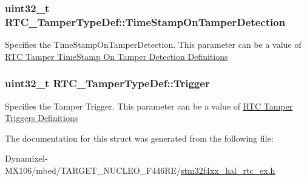 \subsubsection[{\texorpdfstring{Time\+Stamp\+On\+Tamper\+Detection}{TimeStampOnTamperDetection}}]{\setlength{\rightskip}{0pt plus 5cm}uint32\+\_\+t R\+T\+C\+\_\+\+Tamper\+Type\+Def\+::\+Time\+Stamp\+On\+Tamper\+Detection}\hypertarget{struct_r_t_c___tamper_type_def_ae2685d2368c30ca2eeb3bd05c5094b2a}{}\label{struct_r_t_c___tamper_type_def_ae2685d2368c30ca2eeb3bd05c5094b2a}
Specifies the Time\+Stamp\+On\+Tamper\+Detection. This parameter can be a value of \hyperlink{group___r_t_c_ex___tamper___time_stamp_on_tamper_detection___definitions}{R\+TC Tamper Time\+Stamp On Tamper Detection Definitions} 
\subsubsection[{\texorpdfstring{Trigger}{Trigger}}]{\setlength{\rightskip}{0pt plus 5cm}uint32\+\_\+t R\+T\+C\+\_\+\+Tamper\+Type\+Def\+::\+Trigger}\hypertarget{struct_r_t_c___tamper_type_def_a0266f7aca365a9cf468cc2571d9f9395}{}\label{struct_r_t_c___tamper_type_def_a0266f7aca365a9cf468cc2571d9f9395}
Specifies the Tamper Trigger. This parameter can be a value of \hyperlink{group___r_t_c_ex___tamper___trigger___definitions}{R\+TC Tamper Triggers Definitions} 

The documentation for this struct was generated from the following file\+:\begin{DoxyCompactItemize}
\item 
Dynamixel-\/\+M\+X106/mbed/\+T\+A\+R\+G\+E\+T\+\_\+\+N\+U\+C\+L\+E\+O\+\_\+\+F446\+R\+E/\hyperlink{stm32f4xx__hal__rtc__ex_8h}{stm32f4xx\+\_\+hal\+\_\+rtc\+\_\+ex.\+h}\end{DoxyCompactItemize}
